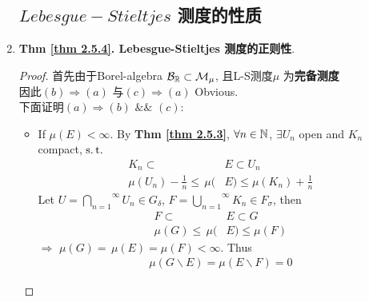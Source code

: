 \begin{enumerate}
\subsection{$Lebesgue-Stieltjes$ 测度的性质}
		\item \textbf{Thm \ref{thm 2.5.4}. Lebesgue-Stieltjes 测度的正则性}. \\
		\begin{proof}
			首先由于Borel-algebra $\mathcal{B}_{\mathbb{R}} \subset \mathcal{M}_\mu$, 且L-S测度$\mu$ 为\textbf{完备测度}\\
			因此$(b) \Rightarrow (a)$ 与$(c) \Rightarrow (a)$ Obvious. \\
			下面证明$(a) \Rightarrow (b) \,\, \&\& \,\, (c)$:
			
			\vspace*{1em}
			
			\begin{itemize}
				\item If $\mu(E) < \infty$. By \textbf{Thm \ref{thm 2.5.3}}, $\forall n \in \mathbb{N}$, $\exists U_n$ open and $K_n$ compact, $\operatorname{s.t.}$
				\begin{align}
					K_n \subset \, &E \subset U_n \\
					\mu(U_n) - \frac{1}{n} \leq \, \mu(&E) \leq \mu(K_n) + \frac{1}{n}
				\end{align}
				Let $U = \overset{\infty}{\underset{n = 1}{\bigcap}}{U_n} \in G_\delta$, $F = \overset{\infty}{\underset{n = 1}{\bigcup}}{K_n} \in F_\sigma$, then
				\begin{align}
					F \subset \, &E \subset G \\
					\mu(G) \leq \, \mu(&E) \leq \mu(F)
				\end{align}
				$\Rightarrow \,\, \mu(G) = \, \mu(E) = \mu(F) < \infty$. Thus
				\begin{align}
					\mu(G \backslash E) = \mu(E \backslash F) = 0
				\end{align}
			
				\vspace*{16em}
				

\end{itemize}
\end{proof}
\end{enumerate}
